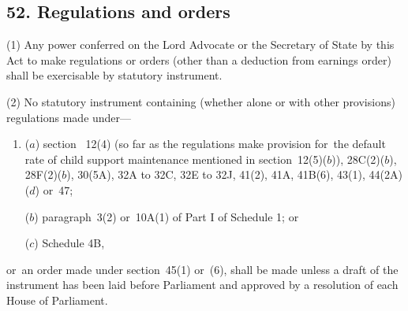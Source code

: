 \documentclass[12pt,a4paper]{article}
\begin{document}
%
%
%
%
%
%
%


\subsection{52. Regulations and orders}

(1) Any power conferred on 
the Lord Advocate or the Secretary of State by this Act to make regulations or orders (other than a deduction from earnings order) shall be exercisable by statutory instrument.

(2) No statutory instrument containing (whether alone or with other provisions) regulations made under—
\begin{enumerate}\item[]
($a$) section~%
12(4)  (so far as the regulations make provision for~the default rate of child support maintenance mentioned in section~12(5)($b$)), 28C(2)($b$), 28F(2)($b$), 30(5A), 
32A to 32C, 32E to 32J,  %
41(2), 41A, 41B(6), 43(1), 44(2A)($d$)
or~47;

($b$) paragraph~3(2)  or~10A(1)  of Part I of Schedule 1; or

($c$) Schedule 4B,
\end{enumerate}
or~an order made under section~45(1)  or~(6), shall be made unless a draft of the instrument has been laid before Parliament and approved by a resolution of each House of Parliament.
\end{document}
